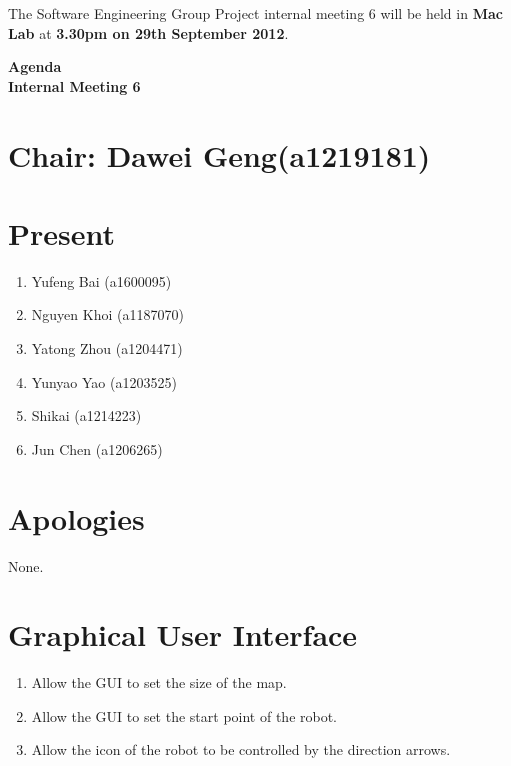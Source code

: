 \documentclass[11pt, a4paper]{article}
\begin{document}
\noindent The Software Engineering Group Project internal meeting 6 will be held in {\bf Mac Lab} at {\bf 3.30pm on 29th September 2012}.


\vspace*{15pt}

\begin{center}
\huge \bf Agenda \\Internal Meeting 6
\end{center}



\section*{Chair: Dawei Geng(a1219181)}
\section*{Present}
\begin{enumerate}
\item Yufeng Bai (a1600095)
\item Nguyen Khoi (a1187070)
\item Yatong Zhou (a1204471)
\item Yunyao Yao (a1203525)
\item Shikai (a1214223)
\item Jun Chen (a1206265)
\end{enumerate}
\section{Apologies}
None.

\section{Graphical User Interface}

\begin{enumerate}
\item Allow the GUI to set the size of the map.
\item Allow the GUI to set the start point of the robot.
\item Allow the icon of the robot to be controlled by the direction arrows. 
\end{enumerate}
\end{document}
